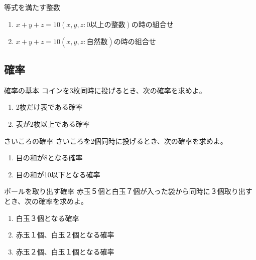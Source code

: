 \documentclass[10pt,dvipdfmx]{jsarticle}
\begin{document}
\begin{itembox}[l]{等式を満たす整数}
  \begin{enumerate}
    \item $x+y+z=10(x,y,z:0以上の整数)$の時の組合せ
    \item $x+y+z=10(x,y,z:自然数)$の時の組合せ
  \end{enumerate}
\end{itembox}

\subsection*{確率}
\begin{itembox}[l]{確率の基本}
  コインを3枚同時に投げるとき、次の確率を求めよ。
  \begin{enumerate}
    \item 2枚だけ表である確率
    \item 表が2枚以上である確率
  \end{enumerate}
\end{itembox}
\begin{itembox}[l]{さいころの確率}
  さいころを2個同時に投げるとき、次の確率を求めよ。
  \begin{enumerate}
    \item 目の和が8となる確率
    \item 目の和が10以下となる確率
  \end{enumerate}
\end{itembox}
\begin{itembox}[l]{ボールを取り出す確率}
  赤玉５個と白玉７個が入った袋から同時に３個取り出すとき、次の確率を求めよ。
  \begin{enumerate}
    \item 白玉３個となる確率
    \item 赤玉１個、白玉２個となる確率
    \item 赤玉２個、白玉１個となる確率
  \end{enumerate}
\end{itembox}
\end{document}
